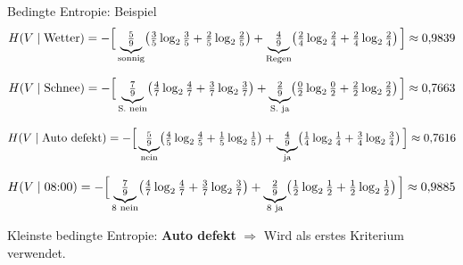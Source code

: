 \begin{frame}{Bedingte Entropie: Beispiel}
\[
  H(V \mid \text{Wetter}) = -\Bigl[\,
    \underbrace{\tfrac{5}{9}}_{\text{sonnig}}
    \bigl(\tfrac{3}{5}\log_2\tfrac{3}{5} + \tfrac{2}{5}\log_2\tfrac{2}{5}\bigr)
    +
    \underbrace{\tfrac{4}{9}}_{\text{Regen}}
    \bigl(\tfrac{2}{4}\log_2\tfrac{2}{4} + \tfrac{2}{4}\log_2\tfrac{2}{4}\bigr)
  \,\Bigr] \approx 0{,}9839
\]

\[
  H(V \mid \text{Schnee}) = -\Bigl[\,
    \underbrace{\tfrac{7}{9}}_{\text{S. nein}}
    \bigl(\tfrac{4}{7}\log_2\tfrac{4}{7} + \tfrac{3}{7}\log_2\tfrac{3}{7}\bigr)
    +
    \underbrace{\tfrac{2}{9}}_{\text{S. ja}}
    \bigl(\tfrac{0}{2}\log_2\tfrac{0}{2} + \tfrac{2}{2}\log_2\tfrac{2}{2}\bigr)
  \,\Bigr] \approx 0{,}7663
\]

\[
  H(V \mid \text{Auto defekt}) = -\Bigl[\,
    \underbrace{\tfrac{5}{9}}_{\text{nein}}
    \bigl(\tfrac{4}{5}\log_2\tfrac{4}{5} + \tfrac{1}{5}\log_2\tfrac{1}{5}\bigr)
    +
    \underbrace{\tfrac{4}{9}}_{\text{ja}}
    \bigl(\tfrac{1}{4}\log_2\tfrac{1}{4} + \tfrac{3}{4}\log_2\tfrac{3}{4}\bigr)
  \,\Bigr] \approx 0{,}7616
\]

\[
  H(V \mid \text{08:00}) = -\Bigl[\,
    \underbrace{\tfrac{7}{9}}_{\text{8 nein}}
    \bigl(\tfrac{4}{7}\log_2\tfrac{4}{7} + \tfrac{3}{7}\log_2\tfrac{3}{7}\bigr)
    +
    \underbrace{\tfrac{2}{9}}_{\text{8 ja}}
    \bigl(\tfrac{1}{2}\log_2\tfrac{1}{2} + \tfrac{1}{2}\log_2\tfrac{1}{2}\bigr)
  \,\Bigr] \approx 0{,}9885
\]

\vspace{0.4em}
\centering
{Kleinste bedingte Entropie: \textbf{Auto defekt} $\Rightarrow$ Wird als erstes Kriterium verwendet.}
\end{frame}


